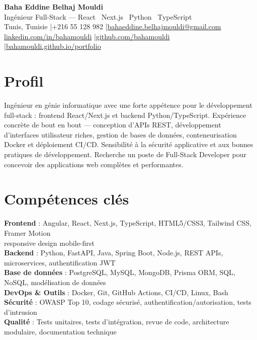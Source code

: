 \documentclass[a4paper,10pt]{article}
\begin{document}
\begin{center}
{\LARGE\bfseries\color{navy} Baha Eddine Belhaj Mouldi}\\[3pt]
{\large Ingénieur Full-Stack --- React \textbar\ Next.js \textbar\ Python \textbar\ TypeScript}\\[5pt]
Tunis, Tunisie \quad|\quad +216 55 128 982 \quad|\quad \href{mailto:bahaeddine.belhajmouldi@gmail.com}{bahaeddine.belhajmouldi@gmail.com}\\[1pt]
\href{https://www.linkedin.com/in/bahamouldi}{linkedin.com/in/bahamouldi} \quad|\quad \href{https://github.com/bahamouldi}{github.com/bahamouldi} \quad|\quad \href{https://bahamouldi.github.io/portfolio/}{bahamouldi.github.io/portfolio}
\end{center}
\vspace{1pt}
\section{Profil}
Ingénieur en génie informatique avec une forte appétence pour le développement full-stack : frontend React/Next.js et backend Python/TypeScript. Expérience concrète de bout en bout --- conception d'APIs REST, développement d'interfaces utilisateur riches, gestion de bases de données, conteneurisation Docker et déploiement CI/CD. Sensibilité à la sécurité applicative et aux bonnes pratiques de développement. Recherche un poste de Full-Stack Developer pour concevoir des applications web complètes et performantes.
\section{Compétences clés}
\textbf{Frontend} : Angular, React, Next.js, TypeScript, HTML5/CSS3, Tailwind CSS, Framer Motion\\[0.5pt]
\hspace*{1.5em} responsive design mobile-first\\[0.5pt]
\textbf{Backend} : Python, FastAPI, Java, Spring Boot, Node.js, REST APIs, microservices, authentification JWT\\[0.5pt]
\textbf{Base de données} : PostgreSQL, MySQL, MongoDB, Prisma ORM, SQL, NoSQL, modélisation de données\\[0.5pt]
\textbf{DevOps \& Outils} : Docker, Git, GitHub Actions, CI/CD, Linux, Bash\\[0.5pt]
\textbf{Sécurité} : OWASP Top 10, codage sécurisé, authentification/autorisation, tests d'intrusion\\[0.5pt]
\textbf{Qualité} : Tests unitaires, tests d'intégration, revue de code, architecture modulaire, documentation technique
\end{document}
